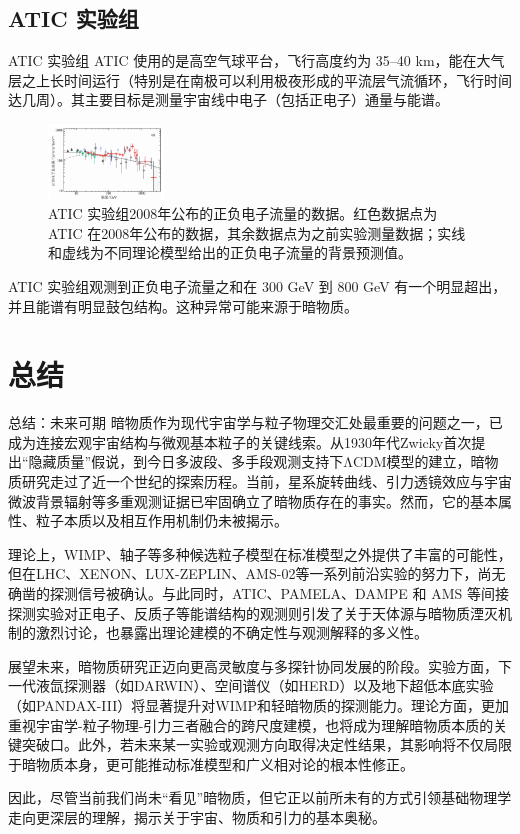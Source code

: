 \documentclass{beamer} %
\begin{document}
\subsection{ATIC 实验组}

\begin{frame}{ATIC 实验组}
ATIC 使用的是高空气球平台，飞行高度约为 35–40 km，能在大气层之上长时间运行（特别是在南极可以利用极夜形成的平流层气流循环，飞行时间达几周）。其主要目标是测量宇宙线中电子（包括正电子）通量与能谱。

\begin{figure}[!htbp]
    \centering    
    \includegraphics[height=2cm]{Img/4-3.png}
    \caption{ATIC 实验组2008年公布的正负电子流量的数据。红色数据点为 ATIC 在2008年公布的数据，其余数据点为之前实验测量数据；实线和虚线为不同理论模型给出的正负电子流量的背景预测值。 }
    \label{4-3}
\end{figure}

ATIC 实验组观测到正负电子流量之和在 300 GeV 到 800 GeV 有一个明显超出，并且能谱有明显鼓包结构。这种异常可能来源于暗物质。
\end{frame}

\section{总结}

\begin{frame}{总结：未来可期}
暗物质作为现代宇宙学与粒子物理交汇处最重要的问题之一，已成为连接宏观宇宙结构与微观基本粒子的关键线索。从1930年代Zwicky首次提出“隐藏质量”假说，到今日多波段、多手段观测支持下ΛCDM模型的建立，暗物质研究走过了近一个世纪的探索历程。当前，星系旋转曲线、引力透镜效应与宇宙微波背景辐射等多重观测证据已牢固确立了暗物质存在的事实。然而，它的基本属性、粒子本质以及相互作用机制仍未被揭示。

理论上，WIMP、轴子等多种候选粒子模型在标准模型之外提供了丰富的可能性，但在LHC、XENON、LUX-ZEPLIN、AMS-02等一系列前沿实验的努力下，尚无确凿的探测信号被确认。与此同时，ATIC、PAMELA、DAMPE 和 AMS 等间接探测实验对正电子、反质子等能谱结构的观测则引发了关于天体源与暗物质湮灭机制的激烈讨论，也暴露出理论建模的不确定性与观测解释的多义性。
\end{frame}

\begin{frame}
展望未来，暗物质研究正迈向更高灵敏度与多探针协同发展的阶段。实验方面，下一代液氙探测器（如DARWIN）、空间谱仪（如HERD）以及地下超低本底实验（如PANDAX-III）将显著提升对WIMP和轻暗物质的探测能力。理论方面，更加重视宇宙学-粒子物理-引力三者融合的跨尺度建模，也将成为理解暗物质本质的关键突破口。此外，若未来某一实验或观测方向取得决定性结果，其影响将不仅局限于暗物质本身，更可能推动标准模型和广义相对论的根本性修正。

因此，尽管当前我们尚未“看见”暗物质，但它正以前所未有的方式引领基础物理学走向更深层的理解，揭示关于宇宙、物质和引力的基本奥秘。
\end{frame}
\end{document}
